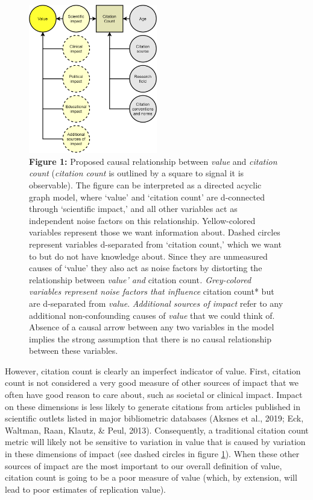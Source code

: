 \documentclass[
  english,
  man,floatsintext]{apa6}
\begin{document}
\begin{figure}
\centering
\includegraphics[width=0.5\textwidth,height=\textheight]{figure_1.png}
\caption{\textbf{Figure 1:} Proposed causal relationship between \emph{value} and \emph{citation count} (\emph{citation count} is outlined by a square to signal it is observable). The figure can be interpreted as a directed acyclic graph model, where `value' and `citation count' are d-connected through `scientific impact,' and all other variables act as independent noise factors on this relationship. Yellow-colored variables represent those we want information about. Dashed circles represent variables d-separated from `citation count,' which we want to but do not have knowledge about. Since they are unmeasured causes of `value' they also act as noise factors by distorting the relationship between \emph{value' and }citation count\emph{. Grey-colored variables represent noise factors that influence }citation count* but are d-separated from \emph{value}. \emph{Additional sources of impact} refer to any additional non-confounding causes of \emph{value} that we could think of. Absence of a causal arrow between any two variables in the model implies the strong assumption that there is no causal relationship between these variables. \label{fig:1}}
\end{figure}

However, citation count is clearly an imperfect indicator of value. First, citation count is not considered a very good measure of other sources of impact that we often have good reason to care about, such as societal or clinical impact. Impact on these dimensions is less likely to generate citations from articles published in scientific outlets listed in major bibliometric databases (Aksnes et al., 2019; Eck, Waltman, Raan, Klautz, \& Peul, 2013). Consequently, a traditional citation count metric will likely not be sensitive to variation in value that is caused by variation in these dimensions of impact (see dashed circles in figure \ref{fig:1}). When these other sources of impact are the most important to our overall definition of value, citation count is going to be a poor measure of value (which, by extension, will lead to poor estimates of replication value).
\end{document}
